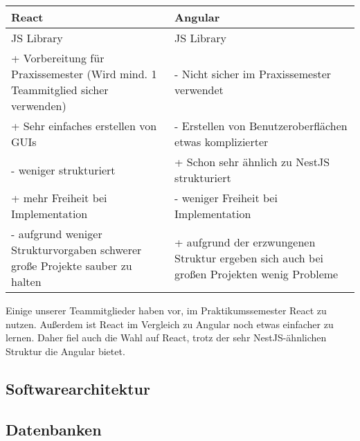 \begin{table}[!h]
    \centering
    \begin{tabular}{|l|l|} 
    \hline
    React                                                                      & Angular                                                                    \\ 
    \hline
    JS Library                                                             & JS Library                                                           \\ 
    \hline
    + Vorbereitung für Praxissemester (Wird mind. 1 Teammitglied sicher verwenden) & - Nicht sicher im Praxissemester verwendet                \\ 
    \hline
    + Sehr einfaches erstellen von GUIs                & - Erstellen von Benutzeroberflächen etwas komplizierter  \\ 
    \hline
    - weniger strukturiert                                        & + Schon sehr ähnlich zu NestJS strukturiert        \\ 
    \hline
    + mehr Freiheit bei Implementation                    & - weniger Freiheit bei Implementation                                  \\ 
    \hline
    - aufgrund weniger Strukturvorgaben schwerer große Projekte sauber zu halten                               & + aufgrund der erzwungenen Struktur ergeben sich auch bei großen Projekten wenig Probleme                           \\
    \hline
    \end{tabular}
    \end{table}

Einige unserer Teammitglieder haben vor, im Praktikumssemester React zu nutzen. 
Außerdem ist React im Vergleich zu Angular noch etwas einfacher zu lernen.
Daher fiel auch die Wahl auf React, trotz der sehr NestJS-ähnlichen Struktur die Angular bietet.

\subsection{Softwarearchitektur}

\subsection{Datenbanken}